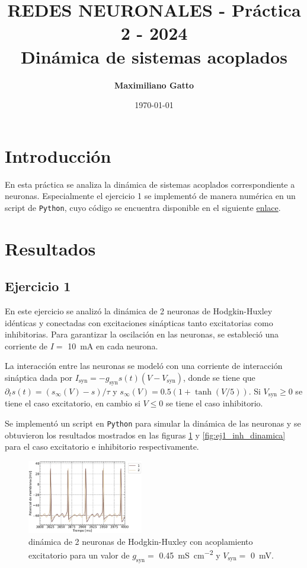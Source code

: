 \documentclass[11pt, twocolumn]{article}
\title{{\large REDES NEURONALES - Práctica 2 - 2024} \\ \vspace{1cm}\textbf{Dinámica de sistemas acoplados}}
\author[ ]{\textbf{Maximiliano Gatto}}
\affil[ ]{Instituto Balseiro (UNCuyo - CNEA) - Bariloche, Río Negro, Argentina\vspace{0.4cm}}
\affil[ ]{\href{mailto:maximiliano.gatto@ib.edu.ar}{maximiliano.gatto@ib.edu.ar}}
\date{\today}
\begin{document}
\maketitle

\section{Introducción}
En esta práctica se analiza la dinámica de sistemas acoplados correspondiente a neuronas. Especialmente el ejercicio 1 se implementó de manera numérica en un script de \texttt{Python}, cuyo código se encuentra disponible en el siguiente \href{https://github.com/elmasi2393/Redes-neuronales}{enlace}.


\section{Resultados}

\subsection*{Ejercicio 1}
En este ejercicio se analizó la dinámica de 2 neuronas de Hodgkin-Huxley idénticas y conectadas con excitaciones sinápticas tanto excitatorias como inhibitorias. Para garantizar la oscilación en las neuronas, se estableció una corriente de $I = $ \SI{10}{\milli\ampere} en cada neurona.

La interacción entre las neuronas se modeló con una corriente de interacción sináptica dada por \(I_\text{syn} = -g_\text{syn} s(t)(V-V_\text{syn})\), donde se tiene que \(\partial _t s(t) = (s_\infty(V) - s) / \tau\) y \(s_\infty(V) = 0.5(1+\tanh (V/5))\). Si \(V_\text{syn} \geq 0\) se tiene el caso excitatorio, en cambio si \(V \leq 0\) se tiene el caso inhibitorio.

Se implementó un script en \texttt{Python} para simular la dinámica de las neuronas y se obtuvieron los resultados mostrados en las figuras \ref{fig:ej1_exc_dinamica} y \ref{fig:ej1_inh_dinamica} para el caso excitatorio e inhibitorio respectivamente. 

\begin{figure} [htbp]
    \centering
    \includegraphics[width=0.45\textwidth]{figuras/excitatorio.pdf}
    \caption{dinámica de 2 neuronas de Hodgkin-Huxley con acoplamiento excitatorio para un valor de \(g_\text{syn} =\) \SI{0.45}{\milli\siemens\per \centi\meter\squared} y \(V_\text{syn} =\) \SI{0}{\milli\volt}.}
    \label{fig:ej1_exc_dinamica}    
\end{figure}
\end{document}
